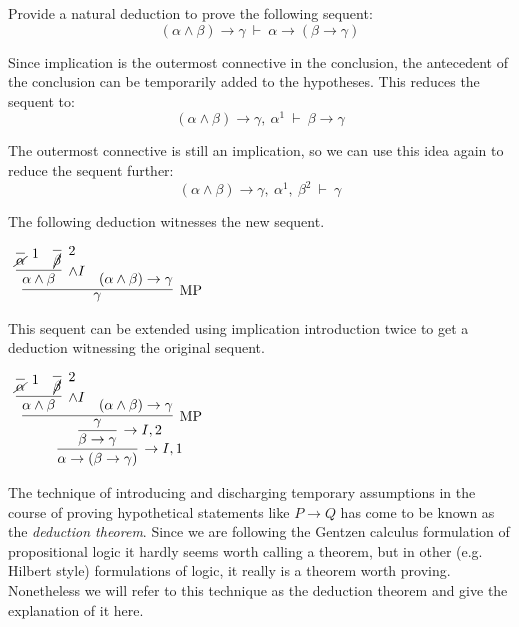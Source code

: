 \documentclass{book}
\begin{document}
    \begin{eg}[Currying]
        
        Provide a natural deduction to prove the following sequent: $$(\alpha \land \beta) \to \gamma \ \vdash \ \alpha \to (\beta \to \gamma)$$

        Since implication is the outermost connective in the conclusion, the antecedent of the conclusion can be temporarily added to the hypotheses. This reduces the sequent to: $$(\alpha \land \beta) \to \gamma, \ \alpha^{1} \ \vdash \ \beta \to \gamma$$

        The outermost connective is still an implication, so we can use this idea again to reduce the sequent further: $$(\alpha \land \beta) \to \gamma, \ \alpha^{1}, \ \beta^{2} \ \vdash \ \gamma$$

        The following deduction witnesses the new sequent.

        \begin{center}
            $\begin{array}{c}
                \infer[\MP]{\gamma}
                            {\infer[\land I]{\alpha \land \beta}
                                {\infer[1]{\cancel{\alpha}}{} & \infer[2]{\cancel{\beta}}{}}
                            &							
                            (\alpha \land \beta) \to \gamma}
            \end{array}$
        \end{center}

        This sequent can be extended using implication introduction twice to get a deduction witnessing the original sequent. 

        \begin{center}
            $\begin{array}{c}
                \infer[\to I,1]{\alpha \to (\beta \to \gamma)}
                    {\infer[\to I,2]{\beta \to \gamma}
                        {\infer[\MP]{\gamma}
                            {\infer[\land I]{\alpha \land \beta}
                                {\infer[1]{\cancel{\alpha}}{} & \infer[2]{\cancel{\beta}}{}}
                            &							
                            (\alpha \land \beta) \to \gamma}}}
            \end{array}$
        \end{center}
    \end{eg}

    The technique of introducing and discharging temporary assumptions in the course of proving hypothetical statements like $P \to Q$ has come to be known as the \emph{deduction theorem}. Since we are following the Gentzen calculus formulation of propositional logic it hardly seems worth calling a theorem, but in other (e.g. Hilbert style) formulations of logic, it really is a theorem worth proving. Nonetheless we will refer to this technique as the deduction theorem and give the explanation of it here. 
\end{document}
